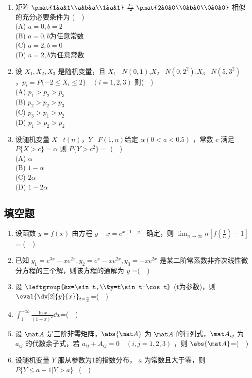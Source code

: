 \begin{enumerate}
\item  矩阵 $\pmat{1&a&1\\a&b&a\\1&a&1}$ 与 $\pmat{2&0&0\\0&b&0\\0&0&0}$ 相似的充分必要条件为 ($\quad$)\\
(A) $a=0,b=2$\\
(B) $a=0,b$为任意常数\\
(C) $a=2,b=0$\\
(D) $a=2,b$为任意常数
\item  设 $X_1,X_2,X_3$ 是随机变量，且 $X_1 $~ $N(0,1)$,$X_2 $~ $N(0,2^2)$,$X_3 $~ $N(5,3^2)$ ，$p_i=P\{-2 \le X_i \le2\}\quad  (i=1,2,3)$ 则($\quad$)\\
(A)  $p_1>p_2>p_3$\\
(B)  $p_2>p_2>p_3$\\
(C)  $p_3>p_1>p_2$\\
(D) $p_1>p_2>p_2$\\
\item 设随机变量 $X$~ $t(n)$，$Y$~ $F(1,n)$给定 $\alpha(0<a<0.5)$ ，常数 $c$ 满足 $P\{X>c\}=\alpha$  则  $P\{Y>c^2\}=$ ($\quad$)\\
(A) $\alpha$\\
(B) $1-\alpha$\\
(C) $2\alpha$\\
(D) $1-2\alpha $
\end{enumerate}
\subsection{填空题}
\begin{enumerate}
\item 设函数 $y=f(x)$ 由方程 $y-x=e^{x(1-y)}$ 确定，则  $\displaystyle \lim_{n\to\infty} n[f(\frac{1}{n})-1]$ = ($\quad$)
\item  已知 $y_1=e^{3x}-xe^{2x},y_2=e^x-xe^{2x},y_3=-xe^{2x}$  是某二阶常系数非齐次线性微分方程的三个解，则该方程的通解为 $y$ =($\quad$)
\item  设
$\leftgroup{&x=\sin t,\\&y=t\sin t+\cos t}$  (t为参数)，则$\displaystyle \eval{ \dv[2]{y}{x}}_{t =\frac{\pi}{4}}$=($\quad$)
\item $\displaystyle \int_{1}^{+\infty }\frac{\ln x}{(1+x)^2}\dd{x}$=($\quad$)
\item 设 $\mat A $ 是三阶非零矩阵，$\abs{\mat A}$   为 $\mat A$ 的行列式，$\mat A_{ij}$  为 $a_{ij}$ 的代数余子式，若 $a_{ij}+A_{ij}=0 \quad (i,j=1,2,3)$ ，则 $\abs{\mat A}$=($\quad$)
\item 设随机变量 $Y$ 服从参数为1的指数分布， $a$ 为常数且大于零，则  $P\{Y \le a+1|Y>a\}$=($\quad$)
\end{enumerate}
